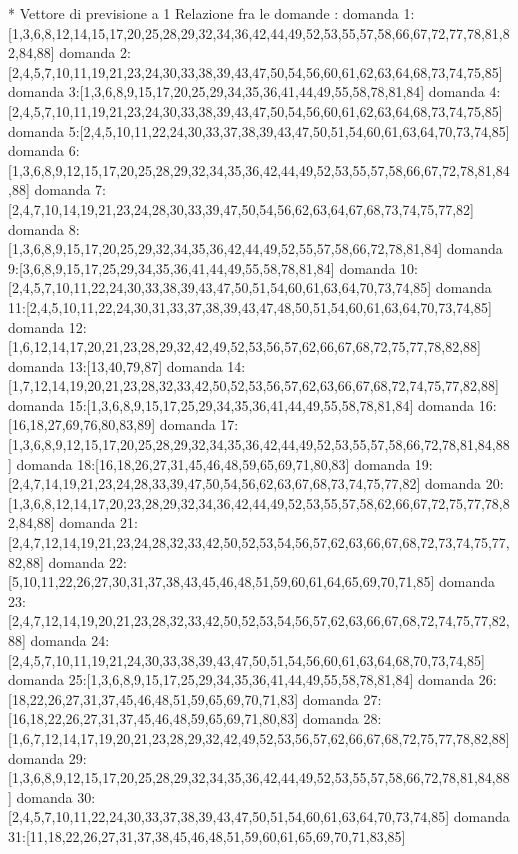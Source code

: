 * Vettore di previsione a 1
Relazione fra le domande :
domanda 1:[1,3,6,8,12,14,15,17,20,25,28,29,32,34,36,42,44,49,52,53,55,57,58,66,67,72,77,78,81,82,84,88]
domanda 2:[2,4,5,7,10,11,19,21,23,24,30,33,38,39,43,47,50,54,56,60,61,62,63,64,68,73,74,75,85]
domanda 3:[1,3,6,8,9,15,17,20,25,29,34,35,36,41,44,49,55,58,78,81,84]
domanda 4:[2,4,5,7,10,11,19,21,23,24,30,33,38,39,43,47,50,54,56,60,61,62,63,64,68,73,74,75,85]
domanda 5:[2,4,5,10,11,22,24,30,33,37,38,39,43,47,50,51,54,60,61,63,64,70,73,74,85]
domanda 6:[1,3,6,8,9,12,15,17,20,25,28,29,32,34,35,36,42,44,49,52,53,55,57,58,66,67,72,78,81,84,88]
domanda 7:[2,4,7,10,14,19,21,23,24,28,30,33,39,47,50,54,56,62,63,64,67,68,73,74,75,77,82]
domanda 8:[1,3,6,8,9,15,17,20,25,29,32,34,35,36,42,44,49,52,55,57,58,66,72,78,81,84]
domanda 9:[3,6,8,9,15,17,25,29,34,35,36,41,44,49,55,58,78,81,84]
domanda 10:[2,4,5,7,10,11,22,24,30,33,38,39,43,47,50,51,54,60,61,63,64,70,73,74,85]
domanda 11:[2,4,5,10,11,22,24,30,31,33,37,38,39,43,47,48,50,51,54,60,61,63,64,70,73,74,85]
domanda 12:[1,6,12,14,17,20,21,23,28,29,32,42,49,52,53,56,57,62,66,67,68,72,75,77,78,82,88]
domanda 13:[13,40,79,87]
domanda 14:[1,7,12,14,19,20,21,23,28,32,33,42,50,52,53,56,57,62,63,66,67,68,72,74,75,77,82,88]
domanda 15:[1,3,6,8,9,15,17,25,29,34,35,36,41,44,49,55,58,78,81,84]
domanda 16:[16,18,27,69,76,80,83,89]
domanda 17:[1,3,6,8,9,12,15,17,20,25,28,29,32,34,35,36,42,44,49,52,53,55,57,58,66,72,78,81,84,88]
domanda 18:[16,18,26,27,31,45,46,48,59,65,69,71,80,83]
domanda 19:[2,4,7,14,19,21,23,24,28,33,39,47,50,54,56,62,63,67,68,73,74,75,77,82]
domanda 20:[1,3,6,8,12,14,17,20,23,28,29,32,34,36,42,44,49,52,53,55,57,58,62,66,67,72,75,77,78,82,84,88]
domanda 21:[2,4,7,12,14,19,21,23,24,28,32,33,42,50,52,53,54,56,57,62,63,66,67,68,72,73,74,75,77,82,88]
domanda 22:[5,10,11,22,26,27,30,31,37,38,43,45,46,48,51,59,60,61,64,65,69,70,71,85]
domanda 23:[2,4,7,12,14,19,20,21,23,28,32,33,42,50,52,53,54,56,57,62,63,66,67,68,72,74,75,77,82,88]
domanda 24:[2,4,5,7,10,11,19,21,24,30,33,38,39,43,47,50,51,54,56,60,61,63,64,68,70,73,74,85]
domanda 25:[1,3,6,8,9,15,17,25,29,34,35,36,41,44,49,55,58,78,81,84]
domanda 26:[18,22,26,27,31,37,45,46,48,51,59,65,69,70,71,83]
domanda 27:[16,18,22,26,27,31,37,45,46,48,59,65,69,71,80,83]
domanda 28:[1,6,7,12,14,17,19,20,21,23,28,29,32,42,49,52,53,56,57,62,66,67,68,72,75,77,78,82,88]
domanda 29:[1,3,6,8,9,12,15,17,20,25,28,29,32,34,35,36,42,44,49,52,53,55,57,58,66,72,78,81,84,88]
domanda 30:[2,4,5,7,10,11,22,24,30,33,37,38,39,43,47,50,51,54,60,61,63,64,70,73,74,85]
domanda 31:[11,18,22,26,27,31,37,38,45,46,48,51,59,60,61,65,69,70,71,83,85]
